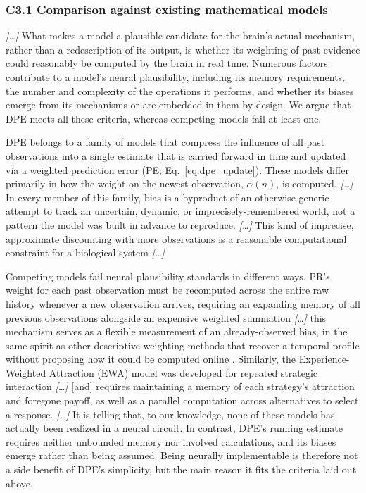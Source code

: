 \subsubsection*{C3.1 Comparison against existing mathematical models}

\begin{ms}

\textit{[\ldots]} What makes a model a plausible candidate for the brain's actual mechanism, rather than a redescription of its output, is whether its weighting of past evidence could reasonably be computed by the brain in real time. Numerous factors contribute to a model's neural plausibility, including its memory requirements, the number and complexity of the operations it performs, and whether its biases emerge from its mechanisms or are embedded in them by design. We argue that DPE meets all these criteria, whereas competing models fail at least one.

DPE belongs to a family of models that compress the influence of all past observations into a single estimate that is carried forward in time and updated via a weighted prediction error (PE; Eq.~\ref{eq:dpe_update}). These models differ primarily in how the weight on the newest observation, $\alpha(n)$, is computed. \textit{[\ldots]} In every member of this family, bias is a byproduct of an otherwise generic attempt to track an uncertain, dynamic, or imprecisely-remembered world, not a pattern the model was built in advance to reproduce. \textit{[\ldots]} This kind of imprecise, approximate discounting with more observations is a reasonable computational constraint for a biological system \textit{[\ldots]}

Competing models fail neural plausibility standards in different ways. PR's weight for each past observation must be recomputed across the entire raw history whenever a new observation arrives, requiring an expanding memory of all previous observations alongside an expensive weighted summation \textit{[\ldots]} this mechanism serves as a flexible measurement of an already-observed bias, in the same spirit as other descriptive weighting methods that recover a temporal profile without proposing how it could be computed online \citep{anderson1965primacy, levi2018strategic, okazawa2018psychophysical}. Similarly, the Experience-Weighted Attraction (EWA) model \citep{camerer1999experience, ho2007selftuning} was developed for repeated strategic interaction \textit{[\ldots]} [and] requires maintaining a memory of each strategy's attraction and foregone payoff, as well as a parallel computation across alternatives to select a response. \textit{[\ldots]} It is telling that, to our knowledge, none of these models has actually been realized in a neural circuit. In contrast, DPE's running estimate requires neither unbounded memory nor involved calculations, and its biases emerge rather than being assumed. Being neurally implementable is therefore not a side benefit of DPE's simplicity, but the main reason it fits the criteria laid out above.


\end{ms}
